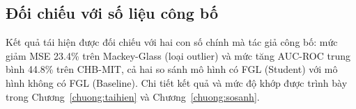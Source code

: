 \subsection{Đối chiếu với số liệu công bố}

Kết quả tái hiện được đối chiếu với hai con số chính mà tác giả công bố: mức giảm MSE 23.4\%
trên Mackey-Glass (loại outlier) và mức tăng AUC-ROC trung bình 44.8\% trên CHB-MIT, cả hai so
sánh mô hình có FGL (Student) với mô hình không có FGL (Baseline). Chi tiết kết quả và mức độ
khớp được trình bày trong Chương~\ref{chuong:taihien} và Chương~\ref{chuong:sosanh}.
